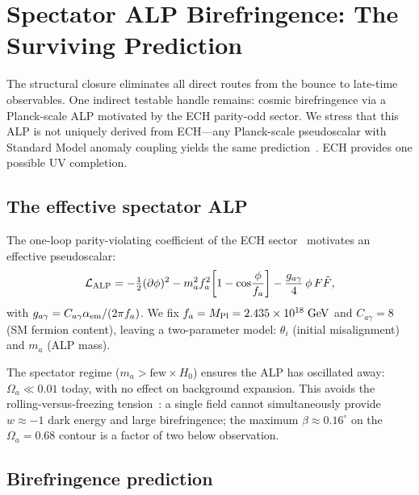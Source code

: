 \documentclass[aps,prd,twocolumn,superscriptaddress,showpacs,preprintnumbers,nofootinbib,longbibliography,floatfix]{revtex4-2}
\newcommand{\MPl}{M_{\rm Pl}}
\begin{document}
\section{Spectator ALP Birefringence: The Surviving Prediction}\label{sec:alp}

The structural closure eliminates all direct routes from the bounce to
late-time observables.  One indirect testable handle remains: cosmic
birefringence via a Planck-scale ALP motivated by the ECH parity-odd sector.
We stress that this ALP is not uniquely derived from ECH---any Planck-scale
pseudoscalar with Standard Model anomaly coupling yields the same
prediction~\cite{Fujita2021,Nakagawa2025}.  ECH provides one possible UV
completion.

\subsection{The effective spectator ALP}\label{sec:alp_model}

The one-loop parity-violating coefficient of the ECH
sector~\cite{Alexander2009,Freidel2005} motivates an effective pseudoscalar:
%
\begin{equation}\label{eq:alp_lagrangian}
\mathcal{L}_{\rm ALP} = -\tfrac{1}{2}(\partial\phi)^2
  - m_a^2 f_a^2\!\left[1 - \cos\!\frac{\phi}{f_a}\right]
  - \frac{g_{a\gamma}}{4}\,\phi\,F\tilde{F},
\end{equation}
%
with $g_{a\gamma} = C_{a\gamma}\alpha_{\rm em}/(2\pi f_a)$.  We fix
$f_a = \MPl = 2.435 \times 10^{18}\;\mathrm{GeV}$ and $C_{a\gamma} = 8$
(SM fermion content), leaving a two-parameter model:
$\theta_i$ (initial misalignment) and $m_a$ (ALP mass).

The spectator regime ($m_a > \mathrm{few}\times H_0$) ensures the ALP
has oscillated away: $\Omega_a \ll 0.01$ today, with no effect on background
expansion.  This avoids the rolling-versus-freezing tension~\cite{Choi2021}:
a single field cannot simultaneously provide $w \approx -1$ dark energy and
large birefringence; the maximum $\beta \approx 0.16^\circ$ on the
$\Omega_a = 0.68$ contour is a factor of two below observation.

\subsection{Birefringence prediction}
\end{document}
